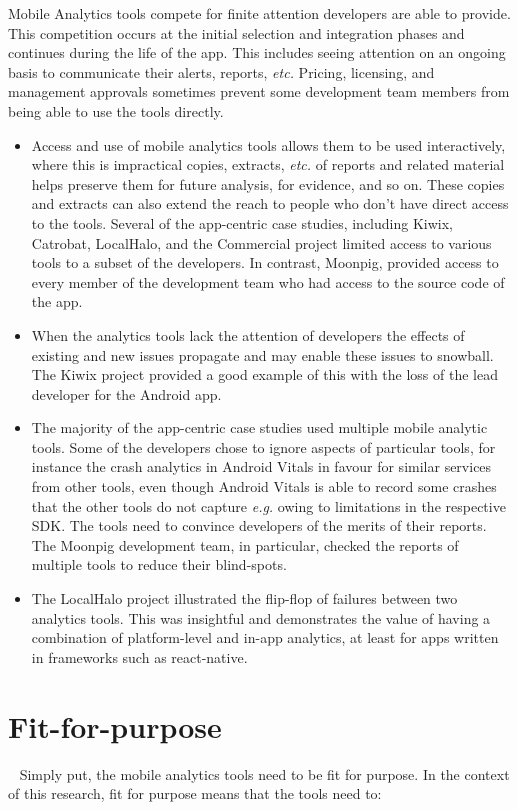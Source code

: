 Mobile Analytics tools compete for finite attention developers are able to provide. This competition occurs at the initial selection and integration phases and continues during the life of the app. This includes seeing attention on an ongoing basis  to communicate their alerts, reports, \emph{etc.} Pricing, licensing, and management approvals sometimes prevent some development team members from being able to use the tools directly.

\begin{itemize}
    \itemsep0em
    \item Access and use of mobile analytics tools allows them to be used interactively, where this is impractical copies, extracts, \emph{etc.} of reports and related material helps  preserve them for future analysis, for evidence, and so on. These copies and extracts can also extend the reach to people who don't have direct access to the tools. Several of the app-centric case studies, including Kiwix, Catrobat, LocalHalo, and the Commercial project limited access to various tools to a subset of the developers. In contrast, Moonpig, provided access to every member of the development team who had access to the source code of the app.
    \item When the analytics tools lack the attention of developers the effects of existing and new issues propagate and may enable these issues to snowball. The Kiwix project provided a good example of this with the loss of the lead developer for the Android app.
    \item The majority of the app-centric case studies used multiple mobile analytic tools. Some of the developers chose to ignore aspects of particular tools, for instance the crash analytics in Android Vitals in favour for similar services from other tools, even though Android Vitals is able to record some crashes that the other tools do not capture \emph{e.g.} owing to limitations in the respective SDK. The tools need to convince developers of the merits of their reports. The Moonpig development team, in particular, checked the reports of multiple tools to reduce their blind-spots.
    \item The LocalHalo project illustrated the flip-flop of failures between two analytics tools. This was insightful and demonstrates the value of having a combination of platform-level and in-app analytics, at least for apps written in frameworks such as react-native.
\end{itemize}


\section{Fit-for-purpose}~\label{section-fit-for-purpose}
Simply put, the mobile analytics tools need to be fit for purpose. In the context of this research, fit for purpose means that the tools need to:


